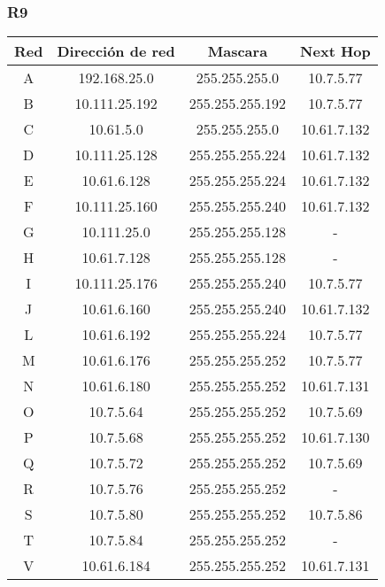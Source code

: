 \subsubsection{R9}
\begin{table}[!htbp]
\centering
  \begin{tabular}{|c|c|c|c|}
  \hline
Red & Dirección de red & Mascara & Next Hop\\ \hline
A & 192.168.25.0 & 255.255.255.0 & 10.7.5.77\\ \hline
B & 10.111.25.192 & 255.255.255.192 & 10.7.5.77 \\ \hline
C & 10.61.5.0 & 255.255.255.0 & 10.61.7.132	 \\ \hline
D & 10.111.25.128 & 255.255.255.224 &10.61.7.132 \\ \hline
E & 10.61.6.128 & 255.255.255.224 &10.61.7.132 \\ \hline
F & 10.111.25.160 & 255.255.255.240 & 10.61.7.132 \\ \hline
G & 10.111.25.0 & 255.255.255.128 & -\\ \hline
H & 10.61.7.128 & 255.255.255.128 & -\\ \hline
I & 10.111.25.176 & 255.255.255.240 & 10.7.5.77 \\ \hline
J & 10.61.6.160 & 255.255.255.240 & 10.61.7.132 \\ \hline
L & 10.61.6.192 & 255.255.255.224 &10.7.5.77 \\ \hline
M & 10.61.6.176 & 255.255.255.252 & 10.7.5.77 \\ \hline
N & 10.61.6.180 & 255.255.255.252 & 10.61.7.131 \\ \hline
O & 10.7.5.64 & 255.255.255.252 & 10.7.5.69 \\ \hline
P & 10.7.5.68 & 255.255.255.252 & 10.61.7.130 \\ \hline
Q & 10.7.5.72 & 255.255.255.252 & 10.7.5.69 \\ \hline
R & 10.7.5.76 & 255.255.255.252 & -\\ \hline
S & 10.7.5.80 & 255.255.255.252 & 10.7.5.86 \\ \hline
T & 10.7.5.84 & 255.255.255.252 & -\\ \hline
V & 10.61.6.184 & 255.255.255.252 & 10.61.7.131 \\
  \hline
 \end{tabular}
\end{table}

\newpage
